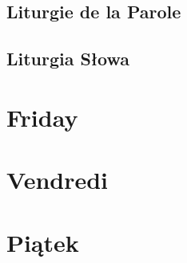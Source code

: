 \newpage
\section[Liturgie de la Parole]{Liturgie de la Parole}
\begin{french}







\end{french}

\newpage
\section[Liturgia Słowa]{Liturgia Słowa}
\begin{polish}







\end{polish}

\chapter[Friday * Vendredi * Piątek][Friday]{Friday\\\myrulev\\Vendredi\\\myrulev\\Piątek}
